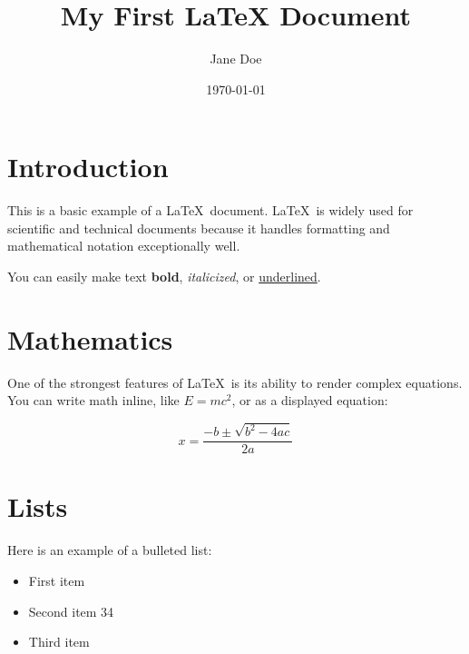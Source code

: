 \documentclass{article}
\title{My First LaTeX Document}
\author{Jane Doe}
\date{\today}
\begin{document}
\maketitle

\section{Introduction}
This is a basic example of a \LaTeX\ document. \LaTeX\ is widely used for scientific and technical documents because it handles formatting and mathematical notation exceptionally well.

You can easily make text \textbf{bold}, \textit{italicized}, or \underline{underlined}.

\section{Mathematics}
One of the strongest features of \LaTeX\ is its ability to render complex equations. You can write math inline, like $E = mc^2$, or as a displayed equation:

\begin{equation}
    x = \frac{-b \pm \sqrt{b^2 - 4ac}}{2a}
\end{equation}

\section{Lists}
Here is an example of a bulleted list:
\begin{itemize}
    \item First item
    \item Second item 34
    \item Third item
\end{itemize}
\end{document}
